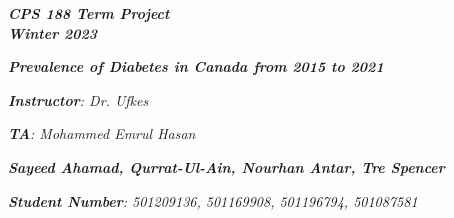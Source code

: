 

\begin{titlepage}
    \begin{center}
        \vspace*{1cm}
            
        \date{}
            
        \huge
            
			\vspace{-1.5cm}            
            
        \textit{\textbf{CPS 188 Term Project \\ Winter 2023}}
            
        \vspace{0.25cm}
            
            
        \vspace{2.5cm}
            
		\vspace{0.25cm}
            
		\textit{\textbf{Prevalence of Diabetes in Canada from 2015 to 2021}}            
            
        \vspace{2.5cm}
            
        \LARGE

		\textit{\textbf{Instructor}: Dr. Ufkes}

		\textit
		{\textbf{TA}: Mohammed Emrul Hasan}


		\vspace{2.5cm}

		\textit{\textbf{Sayeed Ahamad, Qurrat-Ul-Ain, Nourhan Antar, Tre Spencer}}
            
            
        \Large         

		\vspace{2cm}

		\vspace{0cm}            
            
		\Large		
		        
		\vspace{0.25cm} 
		
		\textit{\textbf{Student Number}: 501209136, 501169908, 501196794, 501087581}
            
        \vspace{2cm}
            
        \Large
         
		\vspace{0.25cm}                  
            
        \vspace{0.25cm}
           
            
    \end{center}
\end{titlepage}




